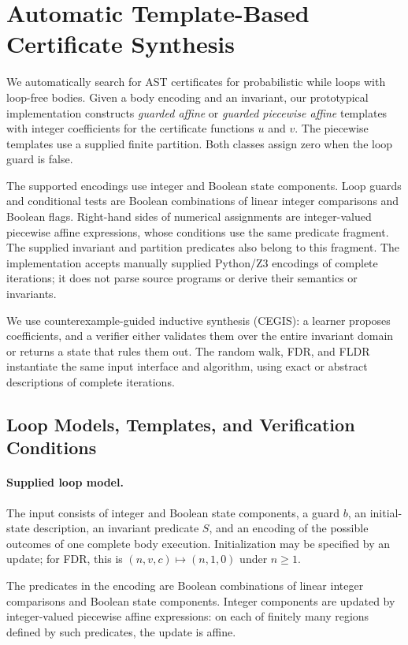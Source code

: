 \section{Automatic Template-Based Certificate Synthesis}
\label{sec:certificate-synthesis}

We automatically search for AST certificates for probabilistic while
loops with loop-free bodies. Given a body encoding and an invariant,
our prototypical implementation constructs \emph{guarded affine}
or \emph{guarded piecewise affine} templates with integer coefficients
for the certificate functions $u$ and $v$.
The piecewise templates use a supplied finite partition.
Both classes assign zero when the loop guard is false.

The supported encodings use integer and Boolean state components.
Loop guards and conditional tests are Boolean combinations of linear
integer comparisons and Boolean flags. Right-hand sides of numerical
assignments are integer-valued piecewise affine expressions, whose
conditions use the same predicate fragment.
The supplied invariant and partition predicates also belong to this
fragment. The implementation accepts manually supplied Python/Z3
encodings of complete iterations; it does not parse source programs
or derive their semantics or invariants.

We use counterexample-guided inductive synthesis (CEGIS):
a learner proposes coefficients, and a verifier either validates them
over the entire invariant domain or returns a state that rules them out.
The random walk, FDR, and FLDR instantiate the same input interface and
algorithm, using exact or abstract descriptions of complete iterations.

\subsection{Loop Models, Templates, and Verification Conditions}
\label{sec:synthesis-constraints}

\paragraph{Supplied loop model.}
The input consists of integer and Boolean state components, a guard $b$,
an initial-state description, an invariant predicate $S$, and an encoding
of the possible outcomes of one complete body execution.
Initialization may be specified by an update; for FDR, this is
$(n,v,c)\mapsto(n,1,0)$ under $n\geq1$.

The predicates in the encoding are Boolean combinations of linear
integer comparisons and Boolean state components.
Integer components are updated by integer-valued piecewise affine
expressions: on each of finitely many regions defined by such
predicates, the update is affine.

